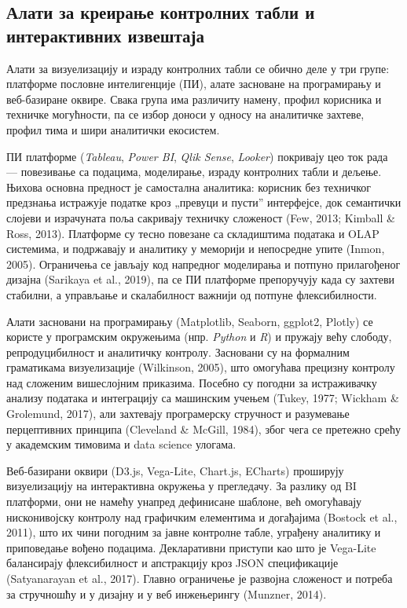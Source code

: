 \subsection{Алати за креирање контролних табли и интерактивних извештаја}
Алати за визуелизацију и израду контролних табли се обично деле у три групе: платформе пословне интелигенције (ПИ), алате засноване на програмирању и веб-базиране оквире. Свака група има различиту намену, профил корисника и техничке могућности, па се избор доноси у односу на аналитичке захтеве, профил тима и шири аналитички екосистем.

ПИ платформе (\textit{Tableau}, \textit{Power BI}, \textit{Qlik Sense}, \textit{Looker}) покривају цео ток рада — повезивање са подацима, моделирање, израду контролних табли и дељење. Њихова основна предност је самостална аналитика: корисник без техничког предзнања истражује податке кроз „превуци и пусти” интерфејсе, док семантички слојеви и израчуната поља сакривају техничку сложеност (Few, 2013; Kimball \& Ross, 2013). Платформе су тесно повезане са складиштима података и OLAP системима, и подржавају и аналитику у меморији и непосредне упите (Inmon, 2005). Ограничења се јављају код напредног моделирања и потпуно прилагођеног дизајна (Sarikaya et al., 2019), па се ПИ платформе препоручују када су захтеви стабилни, а управљање и скалабилност важнији од потпуне флексибилности.

Алати засновани на програмирању (Matplotlib, Seaborn, ggplot2, Plotly) се користе у програмским окружењима (нпр. \textit{Python} и \textit{R}) и пружају већу слободу, репродуцибилност и аналитичку контролу. Засновани су на формалним граматикама визуелизације (Wilkinson, 2005), што омогућава прецизну контролу над сложеним вишеслојним приказима. Посебно су погодни за истраживачку анализу података и интеграцију са машинским учењем (Tukey, 1977; Wickham \& Grolemund, 2017), али захтевају програмерску стручност и разумевање перцептивних принципа (Cleveland \& McGill, 1984), због чега се претежно срећу у академским тимовима и data science улогама.

Веб-базирани оквири (D3.js, Vega-Lite, Chart.js, ECharts) проширују визуелизацију на интерактивна окружења у прегледачу. За разлику од BI платформи, они не намећу унапред дефинисане шаблоне, већ омогућавају нисконивојску контролу над графичким елементима и догађајима (Bostock et al., 2011), што их чини погодним за јавне контролне табле, уграђену аналитику и приповедање вођено подацима. Декларативни приступи као што је Vega-Lite балансирају флексибилност и апстракцију кроз JSON спецификације (Satyanarayan et al., 2017). Главно ограничење је развојна сложеност и потреба за стручношћу и у дизајну и у веб инжењерингу (Munzner, 2014).

